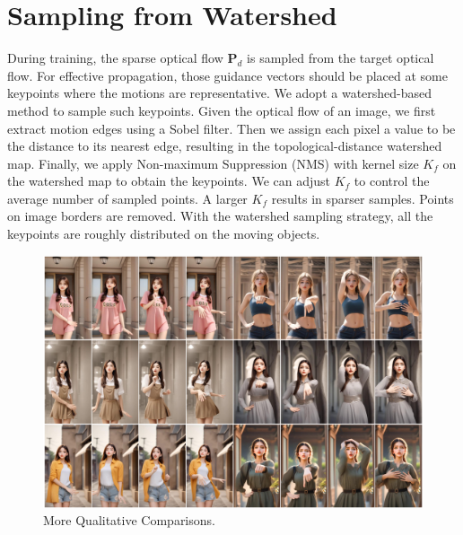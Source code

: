 \appendix
\section{Sampling from Watershed}
\label{sec: appendix1}

 During training, the sparse optical flow $\mathbf{P}_{d}$ is sampled from the target optical flow. For effective propagation, those guidance vectors should be placed at some keypoints where the motions are representative. We adopt a watershed-based~\citep{zhan2019self} method to sample such keypoints. Given the optical flow of an image, we first extract motion edges using a Sobel filter. Then we assign each pixel a value to be the distance to its nearest edge, resulting in the topological-distance watershed map. Finally, we apply Non-maximum Suppression (NMS) with kernel size $K_f$ on the watershed map to obtain the keypoints. We can adjust $K_f$ to control the average number of sampled points. A larger $K_f$ results in sparser samples. Points on image borders are removed. With the watershed sampling strategy, all the keypoints are roughly distributed on the moving objects.


\begin{figure}[t]
    \centering
    \includegraphics[width=1.0\columnwidth]{./image/appendix_fig1.pdf}
    \vspace{-15pt}
    \caption{More Qualitative Comparisons.}
    \label{fig: appendix_fig1}
\end{figure}

